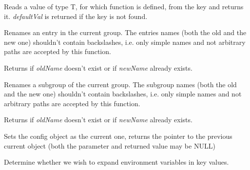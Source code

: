 \label{wxconfigbasereadobject}


Reads a value of type T, for which function
 is defined, from the key and returns it. 
{\it defaultVal} is returned if the key is not found.


\label{wxconfigbaserenameentry}


Renames an entry in the current group. The entries names (both the old and
the new one) shouldn't contain backslashes, i.e. only simple names and not
arbitrary paths are accepted by this function.

Returns \false if {\it oldName} doesn't exist or if {\it newName} already
exists.


\label{wxconfigbaserenamegroup}


Renames a subgroup of the current group. The subgroup names (both the old and
the new one) shouldn't contain backslashes, i.e. only simple names and not
arbitrary paths are accepted by this function.

Returns \false if {\it oldName} doesn't exist or if {\it newName} already
exists.


\label{wxconfigbaseset}


Sets the config object as the current one, returns the pointer to the previous
current object (both the parameter and returned value may be NULL)


\label{wxconfigbasesetexpandenvvars}


Determine whether we wish to expand environment variables in key values.


\label{wxconfigbasesetpath}


